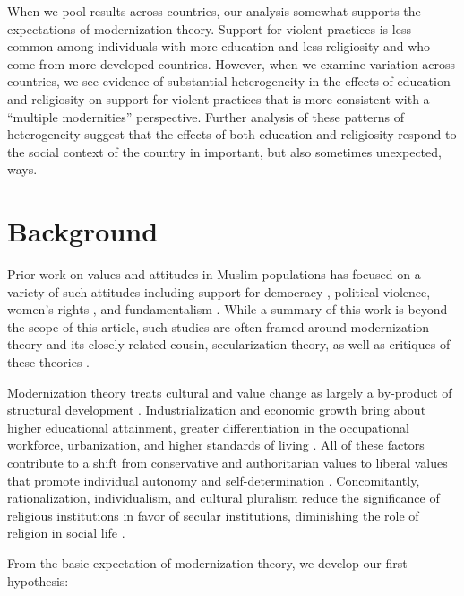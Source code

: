 \documentclass[10pt,letterpaper]{article}
\begin{document}
When we pool results across countries, our analysis somewhat supports the expectations of modernization theory. Support for violent practices is less common among individuals with more education and less religiosity and who come from more developed countries. However, when we examine variation across countries, we see evidence of substantial heterogeneity in the effects of education and religiosity on support for violent practices that is more consistent with a ``multiple modernities'' perspective. Further analysis of these patterns of heterogeneity suggest that the effects of both education and religiosity respond to the social context of the country in important, but also sometimes unexpected, ways.

\section*{Background}

Prior work on values and attitudes in Muslim populations has focused on a variety of such attitudes including support for democracy \cite{jamal_attitudes_2008, ciftci_modernization_2010, ciftci_secularislamist_2013}, political violence\cite{mousseau_urban_2011, berger_foreign_2014}, women's rights \cite{inglehart_true_2003}, and fundamentalism \cite{moaddel_religious_2018}. While a summary of this work is beyond the scope of this article, such studies are often framed around modernization theory and its closely related cousin, secularization theory, as well as critiques of these theories \cite{jamal_reassessing_2006, moaddel_introduction_2007, ciftci_modernization_2010}.

Modernization theory treats cultural and value change as largely a by-product of structural development \cite{lerner_passing_1958, parsons_social_1964, inkeles_becoming_1974}. Industrialization and economic growth bring about higher educational attainment, greater differentiation in the occupational workforce, urbanization, and higher standards of living \cite{rostow_stages_1960}. All of these factors contribute to a shift from conservative and authoritarian values to liberal values that promote individual autonomy and self-determination \cite{parsons_social_1964}. Concomitantly, rationalization, individualism, and cultural pluralism reduce the significance of religious institutions in favor of secular institutions, diminishing the role of religion in social life \cite{wilson_religion_1966, bruce_secularization_2011, emerson_rise_2006}.

From the basic expectation of modernization theory, we develop our first hypothesis:
\end{document}
